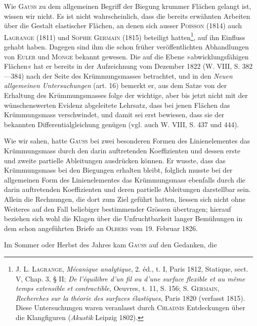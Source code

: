 \par
Wie \textsc{Gauss} zu dem allgemeinen Begriff der Biegung krummer Flächen
gelangt ist, wissen wir nicht. Es ist nicht wahrscheinlich, dass die bereits
erwähnten Arbeiten über die Gestalt elastischer Flächen, an denen sich ausser
\textsc{Poisson} (1814) auch \textsc{Lagrange} (1811) und \textsc{Sophie Germain} (1815) beteiligt
hatten\footnote{\textsc{J. L. Lagrange}, \textit{Mécanique analytique}, 2. éd., t. I, Paris 1812, Statique, sect. V, Chap. 3, § II; \textit{De l’équilibre d’un fil ou d’une surface flexible et au même temps extensible et contractible}, Oeuvres, t. 11, S. 156; \textsc{S. Germain}, \textit{Recherches sur la théorie des surfaces élastiques}, Paris 1820 (verfasst 1815). Diese Untersuchungen waren veranlasst durch \textsc{Chladnis} Entdeckungen über die Klangfiguren (\textit{Akustik} Leipzig 1802).}, auf ihn Einfluss gehabt haben. Dagegen sind ihm die schon früher
veröffentlichten Abhandlungen von \textsc{Euler} und \textsc{Monge} bekannt gewesen. Die
auf die Ebene »abwicklungsfähigen Flächen« hat er bereits in der Aufzeichnung
vom Dezember 1822 (W. VIII, S. 382—384) nach der Seite des Krümmungsmasses
betrachtet, und in den \textit{Neuen allgemeinen Untersuchungen} (art. 16) bemerkt
er, aus dem Satze von der Erhaltung des Krümmungsmasses folge der
wichtige, aber bis jetzt nicht mit der wünschenswerten Evidenz abgeleitete
Lehrsatz, dass bei jenen Flächen das Krümmungsmass verschwindet, und damit
sei erst bewiesen, dass sie der bekannten Differentialgleichung genügen (vgl.
auch W. VIII, S. 437 und 444).
\par
Wie wir sahen, hatte \textsc{Gauss} bei zwei besonderen Formen des Linienelementes
das Krümmungsmass durch den darin auftretenden Koeffizienten
und dessen erste und zweite partielle Ableitungen ausdrücken können. Er
wusste, dass das Krümmungsmass bei den Biegungen erhalten bleibt, folglich
musste bei der allgemeinen Form des Linienelementes das Krümmungsmass
ebenfalls durch die darin auftretenden Koeffizienten und deren partielle Ableitungen
darstellbar sein. Allein die Rechnungen, die dort zum Ziel geführt
hatten, liessen sich nicht ohne Weiteres auf den Fall beliebiger bestimmender
Grössen übertragen; hierauf beziehen sich wohl die Klagen über die Unfruchtbarkeit
\clearpage{}\setcounter{footnote}{0}
\noindent langer Bemühungen in dem schon angeführten Briefe an \textsc{Olbers}
vom 19. Februar 1826.
\par
Im Sommer oder Herbst des Jahres kam \textsc{Gauss} auf den Gedanken, die
